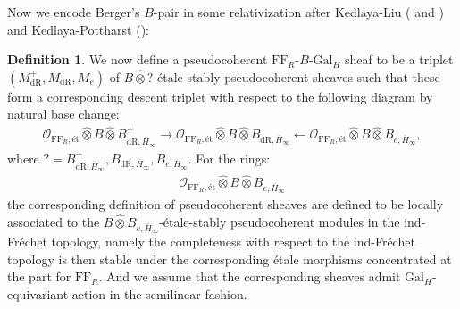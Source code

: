 \documentclass[12pt]{amsart}
\theoremstyle{definition}
\newtheorem{definition}[theorem]{Definition}
\numberwithin{equation}{section}
\begin{document}
\indent Now we encode Berger's $B$-pair in some relativization after Kedlaya-Liu (\cite[Definition 9.3.11]{KL1} and \cite[Definition 4.8.2]{KL2}) and Kedlaya-Pottharst (\cite[Definition 2.17]{KP}):

\begin{definition}
We now define a pseudocoherent $\mathrm{FF}_R$-$B$-$\mathrm{Gal}_H$ sheaf to be a triplet $(M^+_\mathrm{dR},M_\mathrm{dR},M_e)$ of $B\widehat{\otimes}?$-\'etale-stably pseudocoherent sheaves such that these form a corresponding descent triplet with respect to the following diagram by natural base change:
\begin{align}
\mathcal{O}_{\mathrm{FF}_R,\text{\'et}}\widehat{\otimes}B\widehat{\otimes}B_{\mathrm{dR},\overline{H}_\infty}^+ \longrightarrow \mathcal{O}_{\mathrm{FF}_R,\text{\'et}}\widehat{\otimes}B\widehat{\otimes}B_{\mathrm{dR},\overline{H}_\infty}\longleftarrow \mathcal{O}_{\mathrm{FF}_R,\text{\'et}}\widehat{\otimes}B\widehat{\otimes}B_{e,\overline{H}_\infty},	
\end{align}
where $?=B_{\mathrm{dR},\overline{H}_\infty}^+,B_{\mathrm{dR},\overline{H}_\infty},B_{e,\overline{H}_\infty}$. For the rings:
\begin{align}
\mathcal{O}_{\mathrm{FF}_R,\text{\'et}}\widehat{\otimes}B\widehat{\otimes}B_{e,\overline{H}_\infty}	
\end{align}
the corresponding definition of pseudocoherent sheaves are defined to be locally associated to the $B\widehat{\otimes}B_{e,\overline{H}_\infty}$-\'etale-stably pseudocoherent modules in the ind-Fr\'echet topology, namely the completeness with respect to the ind-Fr\'echet topology is then stable under the corresponding \'etale morphisms concentrated at the part for $\mathrm{FF}_R$. And we assume that the corresponding sheaves admit $\mathrm{Gal}_H$-equivariant action in the semilinear fashion.	
\end{definition}
\end{document}
